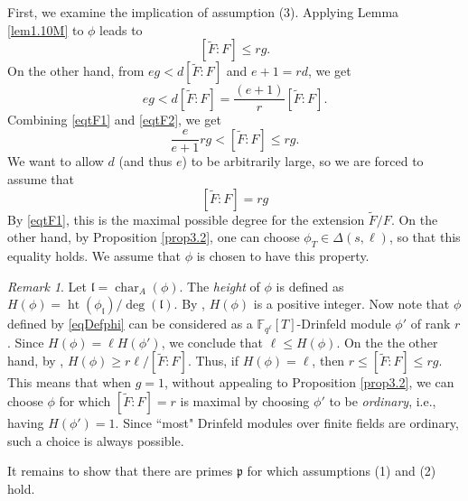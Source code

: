 \documentclass[12pt]{amsart}
\theoremstyle{definition}
\theoremstyle{remark}
\newtheorem{rem}[thm]{Remark}
\numberwithin{equation}{section}
\numberwithin{thm}{section}
\DeclareMathOperator{\Ht}{ht}
\DeclareMathOperator{\chr}{char}
\newcommand{\fl}{\mathfrak{l}}
\newcommand{\fp}{\mathfrak{p}}
\newcommand{\F}{\mathbb{F}}
\newcommand{\tF}{\widetilde{F}}
\begin{document}
First, we examine the implication of assumption (3). Applying Lemma \ref{lem1.10M} to $\phi$ leads to 
\begin{equation}\label{eqtF1}
	[\tF:F]\leq rg. 
\end{equation}
On the other hand, from $eg<d[\tF:F]$ and $e+1=rd$, we get 
\begin{equation}\label{eqtF2}
	eg<d[\tF:F] = \frac{(e+1)}{r}[\tF:F]. 
\end{equation}
Combining \eqref{eqtF1} and  \eqref{eqtF2}, we get 
$$
\frac{e}{e+1} rg < [\tF:F]\leq rg. 
$$
We want to allow $d$ (and thus $e$) to be arbitrarily large, so we are forced to assume that 
$$
\boxed{ [\tF:F]=rg}
$$
By \eqref{eqtF1}, this is the maximal possible degree for the extension $\tF/F$. On the other hand, by 
Proposition \ref{prop3.2}, one can choose $\phi_T\in \Delta(s, \ell)$,  
so that this equality holds. We assume that $\phi$ is chosen to have this property. 

\begin{rem} Let $\fl=\chr_A(\phi)$. 
	The \textit{height} of $\phi$ is defined as $H(\phi)=\Ht(\phi_\fl)/\deg(\fl)$. By \cite[Lem. 3.2.11]{PapikianGTM}, $H(\phi)$ 
	is a positive integer. Now note that $\phi$ 
	defined by \eqref{eqDefphi} can be considered as a $\F_{q^\ell}[T]$-Drinfeld module $\phi'$ of rank $r$. 
	Since $H(\phi)=\ell H(\phi')$, we conclude that $\ell\leq H(\phi)$. On the the other hand, by \cite[Prop.  4.1.8]{PapikianGTM}, 
	$H(\phi)\geq r\ell/[\tF:F]$. Thus, if $H(\phi)=\ell$, then $r\leq [\tF:F]\leq rg$. This means that when $g=1$, without appealing to Proposition \ref{prop3.2}, 
	we can choose $\phi$ for which $[\tF:F]=r$ is maximal by choosing $\phi'$ to be \textit{ordinary}, i.e., having $H(\phi')=1$.  Since ``most" Drinfeld modules over finite fields are ordinary, such a choice is always possible. 
\end{rem}

It remains to show that there are primes $\fp$ for which assumptions (1) and (2) hold. 
\end{document}
